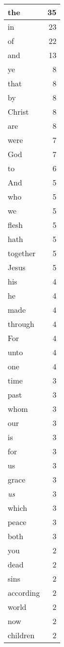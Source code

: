 \begin{center}
\begin{longtable}{l|r}
the & 35\\ \hline 
in & 23\\ \hline 
of & 22\\ \hline 
and & 13\\ \hline 
ye & 8\\ \hline 
that & 8\\ \hline 
by & 8\\ \hline 
Christ & 8\\ \hline 
are & 8\\ \hline 
were & 7\\ \hline 
God & 7\\ \hline 
to & 6\\ \hline 
And & 5\\ \hline 
who & 5\\ \hline 
we & 5\\ \hline 
flesh & 5\\ \hline 
hath & 5\\ \hline 
together & 5\\ \hline 
Jesus & 5\\ \hline 
his & 4\\ \hline 
he & 4\\ \hline 
made & 4\\ \hline 
through & 4\\ \hline 
For & 4\\ \hline 
unto & 4\\ \hline 
one & 4\\ \hline 
time & 3\\ \hline 
past & 3\\ \hline 
whom & 3\\ \hline 
our & 3\\ \hline 
is & 3\\ \hline 
for & 3\\ \hline 
us & 3\\ \hline 
grace & 3\\ \hline 
\emph{us} & 3\\ \hline 
which & 3\\ \hline 
peace & 3\\ \hline 
both & 3\\ \hline 
you & 2\\ \hline 
dead & 2\\ \hline 
sins & 2\\ \hline 
according & 2\\ \hline 
world & 2\\ \hline 
now & 2\\ \hline 
children & 2\\ \hline 

\end{longtable}
\end{center}
